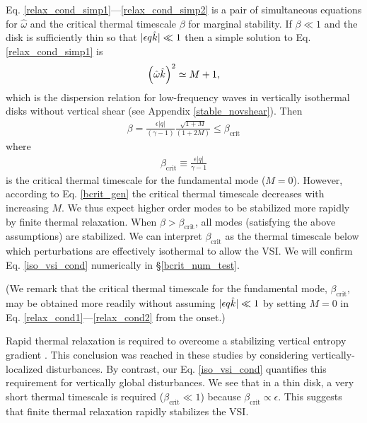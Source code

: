 Eq. \ref{relax_cond_simp1}---\ref{relax_cond_simp2} is a pair of
simultaneous equations for $\hat{\omega}$ and the critical thermal
timescale $\beta$ for marginal stability. If $\beta\ll 1$ and the disk
is sufficiently thin so that $|\epsilon q \hat{k} |\ll 1$
then a simple solution to Eq. \ref{relax_cond_simp1} is 
\begin{align}
  \left(\hat{\omega}\hat{k}\right)^2 \simeq M+1, 
\end{align}
which is the dispersion relation for low-frequency waves in vertically
isothermal disks without vertical shear (see Appendix
\ref{stable_novshear}). Then  
\begin{align}\label{bcrit_gen}
  \beta = \frac{\epsilon|q|}{(\gamma - 1)}
  \frac{\sqrt{1+M}}{(1+2M)} \leq \beta_\mathrm{crit} 
\end{align}
where 
\begin{align}\label{iso_vsi_cond}
  \beta_\mathrm{crit}  \equiv \frac{\epsilon|q|}{\gamma-1}
\end{align}
is the critical thermal timescale for the fundamental mode
($M=0$). However, according to Eq. \ref{bcrit_gen}  the critical
thermal timescale decreases with increasing  $M$. We thus expect
higher order modes to be stabilized more rapidly by finite thermal
relaxation. When $\beta>\beta_\mathrm{crit}$, all modes
(satisfying the above assumptions) are stabilized. We can interpret
$\beta_\mathrm{crit}$ as the thermal timescale below which
perturbations are effectively isothermal to allow the VSI.  We will confirm
Eq. \ref{iso_vsi_cond} numerically in \S\ref{bcrit_num_test}.  

(We remark that the critical thermal timescale for the fundamental
mode, $\beta_\mathrm{crit}$, may be obtained more readily without 
assuming $|\epsilon q \hat{k}|\ll 1$ by setting $M=0$ in
Eq. \ref{relax_cond1}---\ref{relax_cond2} from the onset.) 

Rapid thermal relaxation is required to overcome a stabilizing
vertical entropy gradient \citep{goldreich67,urpin98,urpin03}. This 
conclusion was reached in these studies by considering
vertically-localized disturbances. %
By contrast, our Eq. \ref{iso_vsi_cond} quantifies this requirement
for vertically global disturbances. We see that in a thin disk, a very
short thermal timescale is required ($\beta_\mathrm{crit}\ll 1$)
because $\beta_\mathrm{crit}\propto \epsilon$. 
This suggests that finite thermal relaxation rapidly stabilizes the
VSI.   






